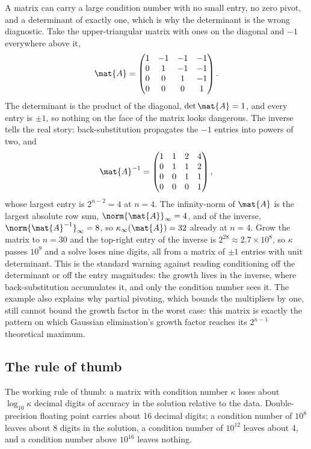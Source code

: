 \begin{example}
A matrix can carry a large condition number with no small entry, no
zero pivot, and a determinant of exactly one, which is why the
determinant is the wrong diagnostic. Take the upper-triangular matrix
with ones on the diagonal and $-1$ everywhere above it,
\[
\mat{A} = \begin{pmatrix} 1 & -1 & -1 & -1 \\ 0 & 1 & -1 & -1 \\ 0 & 0
& 1 & -1 \\ 0 & 0 & 0 & 1 \end{pmatrix}.
\]
The determinant is the product of the diagonal, $\det\mat{A} = 1$, and
every entry is $\pm 1$, so nothing on the face of the matrix looks
dangerous. The inverse tells the real story: back-substitution
propagates the $-1$ entries into powers of two, and
\[
\mat{A}^{-1} = \begin{pmatrix} 1 & 1 & 2 & 4 \\ 0 & 1 & 1 & 2 \\ 0 & 0
& 1 & 1 \\ 0 & 0 & 0 & 1 \end{pmatrix},
\]
whose largest entry is $2^{n-2} = 4$ at $n = 4$. The infinity-norm of
$\mat{A}$ is the largest absolute row sum, $\norm{\mat{A}}_{\infty} =
4$, and of the inverse, $\norm{\mat{A}^{-1}}_{\infty} = 8$, so
$\kappa_{\infty}(\mat{A}) = 32$ already at $n = 4$. Grow the matrix to
$n = 30$ and the top-right entry of the inverse is $2^{28} \approx 2.7
\times 10^{8}$, so $\kappa$ passes $10^{9}$ and a solve loses nine
digits, all from a matrix of $\pm 1$ entries with unit determinant.
This is the standard warning against reading conditioning off the
determinant or off the entry magnitudes: the growth lives in the
inverse, where back-substitution accumulates it, and only the condition
number sees it. The example also explains why partial pivoting, which
bounds the multipliers by one, still cannot bound the growth factor in
the worst case: this matrix is exactly the pattern on which Gaussian
elimination's growth factor reaches its $2^{n-1}$ theoretical maximum.
\end{example}

\subsection{The rule of thumb}

The working rule of thumb: a matrix with condition number
$\kappa$ loses about $\log_{10}\kappa$ decimal digits of accuracy
in the solution relative to the data. Double-precision floating
point carries about 16 decimal digits; a condition number of
$10^{8}$ leaves about 8 digits in the solution, a condition number
of $10^{12}$ leaves about 4, and a condition number above $10^{16}$
leaves nothing.

